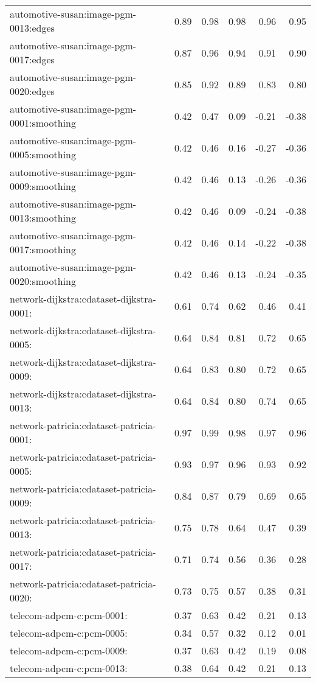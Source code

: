 \begin{longtable}{lrrrrr}
automotive-susan:image-pgm-0013:edges & 0.89 & 0.98 & 0.98 & 0.96 & 0.95 \\
automotive-susan:image-pgm-0017:edges & 0.87 & 0.96 & 0.94 & 0.91 & 0.90 \\
automotive-susan:image-pgm-0020:edges & 0.85 & 0.92 & 0.89 & 0.83 & 0.80 \\
automotive-susan:image-pgm-0001:smoothing & 0.42 & 0.47 & 0.09 & -0.21 & -0.38 \\
automotive-susan:image-pgm-0005:smoothing & 0.42 & 0.46 & 0.16 & -0.27 & -0.36 \\
automotive-susan:image-pgm-0009:smoothing & 0.42 & 0.46 & 0.13 & -0.26 & -0.36 \\
automotive-susan:image-pgm-0013:smoothing & 0.42 & 0.46 & 0.09 & -0.24 & -0.38 \\
automotive-susan:image-pgm-0017:smoothing & 0.42 & 0.46 & 0.14 & -0.22 & -0.38 \\
automotive-susan:image-pgm-0020:smoothing & 0.42 & 0.46 & 0.13 & -0.24 & -0.35 \\
network-dijkstra:cdataset-dijkstra-0001: & 0.61 & 0.74 & 0.62 & 0.46 & 0.41 \\
network-dijkstra:cdataset-dijkstra-0005: & 0.64 & 0.84 & 0.81 & 0.72 & 0.65 \\
network-dijkstra:cdataset-dijkstra-0009: & 0.64 & 0.83 & 0.80 & 0.72 & 0.65 \\
network-dijkstra:cdataset-dijkstra-0013: & 0.64 & 0.84 & 0.80 & 0.74 & 0.65 \\
network-patricia:cdataset-patricia-0001: & 0.97 & 0.99 & 0.98 & 0.97 & 0.96 \\
network-patricia:cdataset-patricia-0005: & 0.93 & 0.97 & 0.96 & 0.93 & 0.92 \\
network-patricia:cdataset-patricia-0009: & 0.84 & 0.87 & 0.79 & 0.69 & 0.65 \\
network-patricia:cdataset-patricia-0013: & 0.75 & 0.78 & 0.64 & 0.47 & 0.39 \\
network-patricia:cdataset-patricia-0017: & 0.71 & 0.74 & 0.56 & 0.36 & 0.28 \\
network-patricia:cdataset-patricia-0020: & 0.73 & 0.75 & 0.57 & 0.38 & 0.31 \\
telecom-adpcm-c:pcm-0001: & 0.37 & 0.63 & 0.42 & 0.21 & 0.13 \\
telecom-adpcm-c:pcm-0005: & 0.34 & 0.57 & 0.32 & 0.12 & 0.01 \\
telecom-adpcm-c:pcm-0009: & 0.37 & 0.63 & 0.42 & 0.19 & 0.08 \\
telecom-adpcm-c:pcm-0013: & 0.38 & 0.64 & 0.42 & 0.21 & 0.13 \\

\end{longtable}
